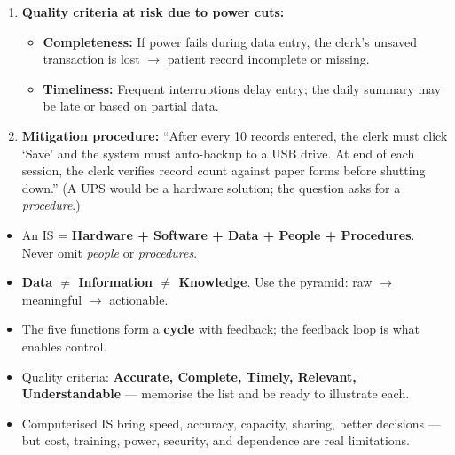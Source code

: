 \documentclass[11pt]{article}
\newcounter{popsec}
\newcounter{popsub}
\newcommand{\courssub}[1]{%
  \stepcounter{popsub}%
  \par\vspace{9pt}\noindent{\popxbold\fontsize{11.5}{13}\selectfont\color{popink}{\color{poporange}\thepopsec.\thepopsub}\hspace{6pt}#1}\par\nopagebreak\vspace{4pt}
}
\begin{document}
\begin{exoresolu}
\begin{enumerate}
\begin{itemize}
            \item Processing: Application calculates age from date of birth, aggregates disease counts for monthly report.
            \item Storage: MySQL database holds all patient records.
            \item Output/Dissemination: Doctor's daily summary on screen; printed/emailed monthly top-10 report.
            \item Feedback/Control: Doctor notices a surge in malaria cases from the daily summary and requests extra rapid-test kits; District Office uses monthly report to allocate drugs.
        \end{itemize}
    \item \textbf{Quality criteria at risk due to power cuts:}
        \begin{itemize}
            \item \textbf{Completeness:} If power fails during data entry, the clerk's unsaved transaction is lost $\to$ patient record incomplete or missing.
            \item \textbf{Timeliness:} Frequent interruptions delay entry; the daily summary may be late or based on partial data.
        \end{itemize}
    \item \textbf{Mitigation procedure:} ``After every 10 records entered, the clerk must click `Save' and the system must auto-backup to a USB drive. At end of each session, the clerk verifies record count against paper forms before shutting down.'' (A UPS would be a hardware solution; the question asks for a \emph{procedure}.)
\end{enumerate}
\end{exoresolu}

\courssub{Exam Tips and Common Pitfalls}

\begin{aretenir}
\begin{itemize}
    \item An IS = \textbf{Hardware + Software + Data + People + Procedures}. Never omit \emph{people} or \emph{procedures}.
    \item \textbf{Data $\neq$ Information $\neq$ Knowledge}. Use the pyramid: raw $\to$ meaningful $\to$ actionable.
    \item The five functions form a \textbf{cycle} with feedback; the feedback loop is what enables control.
    \item Quality criteria: \textbf{Accurate, Complete, Timely, Relevant, Understandable} — memorise the list and be ready to illustrate each.
    \item Computerised IS bring speed, accuracy, capacity, sharing, better decisions — but cost, training, power, security, and dependence are real limitations.
\end{itemize}
\end{aretenir}
\end{document}
